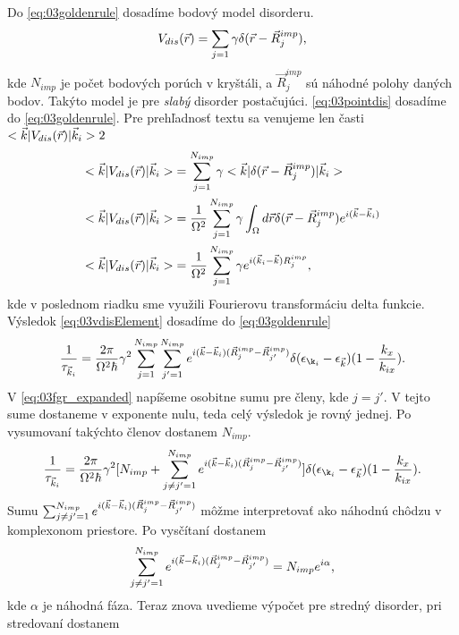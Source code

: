 Do \eqref{eq:03goldenrule} dosadíme bodový model disorderu.
\begin{align}
\label{eq:03pointdis}
V_{dis}(\vec{r})=\sum_{j=1}\gamma \delta(\vec{r}-\vec R_j^{imp})\text{,}
\end{align}
kde $N_{imp}$ je počet bodových porúch v kryštáli, a $\vec R^{imp}_j$ sú náhodné polohy daných bodov. Takýto model  je pre {\it slabý} disorder postačujúci. 
\eqref{eq:03pointdis} dosadíme do \eqref{eq:03goldenrule}. Pre prehľadnosť textu sa venujeme len časti $<\vec{k}|V_{dis}(\vec{r})|\vec{k}_i>2$
\begin{align}
<\vec{k}|V_{dis}(\vec{r})|\vec{k}_i>&=\sum_{j=1}^{N_{imp}}\gamma<\vec{k}|\delta(\vec{r}-\vec R^{imp}_j)|\vec{k}_i>\\
<\vec{k}|V_{dis}(\vec{r})|\vec{k}_i>&=\frac{1}{\Omega^2}\sum_{j=1}^{N_{imp}}\gamma\int_{\Omega}d\vec{r}\delta(\vec{r} -\vec R_j^{imp})e^{i(\vec{k}-\vec{k}_i)}\\
\label{eq:03vdisElement}
<\vec{k}|V_{dis}(\vec{r})|\vec{k}_i>&=\frac{1}{\Omega^2}\sum_{j=1}^{N_{imp}}\gamma e^{i(\vec{k}_i-\vec{k})R_j^{imp}} \text{,}
\end{align}
kde v poslednom riadku sme využili Fourierovu transformáciu delta funkcie. Výsledok \eqref{eq:03vdisElement} dosadíme do \eqref{eq:03goldenrule}
\begin{align}
\label{eq:03fgr_expanded}
\frac{1}{\tau_{\vk_i}} = \frac{2\pi}{\Omega^2\hbar}\gamma^2\sum_{j=1}^{N_{imp}}\sum_{j'=1}^{N_{imp}}e^{i(\vk-\vk_i)(\vec R^{imp}_j-\vec R^{imp}_{j'})}\delta(\epsilon_{\k_i}-\epsilon_{\vk})(1-\frac{k_x}{k_{ix}}) \text{.}
\end{align}
V \eqref{eq:03fgr_expanded} napíšeme osobitne sumu pre členy, kde $j=j'$. V tejto sume dostaneme v exponente nulu, teda celý výsledok je rovný jednej. Po vysumovaní takýchto členov dostanem $N_{imp}$.
\begin{align}
\label{eq:03fgr_expanded2}
\frac{1}{\tau_{\vk_i}} = \frac{2\pi}{\Omega^2\hbar}\gamma^2[N_{imp}+\sum_{j\neq j'=1}^{N_{imp}}e^{i(\vk-\vk_i)(\vec R^{imp}_j-\vec R^{imp}_{j'})}]\delta(\epsilon_{\k_i}-\epsilon_{\vk})(1-\frac{k_x}{k_{ix}}) \text{.}
\end{align}
Sumu $\sum_{j\neq j'=1}^{N_{imp}}e^{i(\vec{k}-\vec{k}_i)(\vec R^{imp}_j-\vec R^{imp}_{j'})}$ môžme interpretovať ako náhodnú chôdzu v komplexonom priestore. Po vysčítaní dostanem
\begin{align}
\sum_{j\neq j'=1}^{N_{imp}}e^{i(\vec{k}-\vec{k}_i)(\vec R^{imp}_j-\vec R^{imp}_{j'})} =N_{imp}e^{i\alpha}\text{,}
\end{align}
kde $\alpha$ je náhodná fáza. Teraz znova uvedieme výpočet pre stredný disorder, pri stredovaní dostanem
